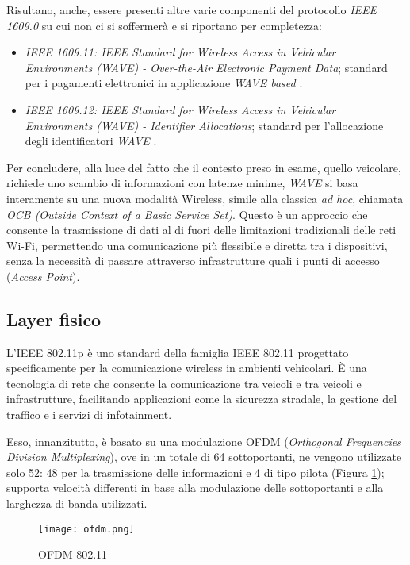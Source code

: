 Risultano, anche, essere presenti altre varie componenti del protocollo \textit{IEEE 1609.0} su cui non ci si soffermerà e si riportano per completezza:

\begin{itemize}
    \item \textit{IEEE 1609.11:  IEEE Standard for Wireless Access in Vehicular Environments (WAVE) - Over-the-Air Electronic Payment Data}; standard per i pagamenti elettronici in applicazione \textit{WAVE based} \cite{5692959}.
    \item \textit{IEEE 1609.12:  IEEE Standard for Wireless Access in Vehicular Environments (WAVE) - Identifier Allocations}; standard per l'allocazione degli identificatori \textit{WAVE} \cite{8877516}.
\end{itemize}

Per concludere, alla luce del fatto che il contesto preso in esame, quello veicolare, richiede uno scambio di informazioni con latenze minime, \textit{WAVE} si basa interamente su una nuova modalità Wireless, simile alla classica \textit{ad hoc}, chiamata \textit{OCB (Outside Context of a Basic Service Set)}. Questo è un approccio che consente la trasmissione di dati al di fuori delle limitazioni tradizionali delle reti Wi-Fi, permettendo una comunicazione più flessibile e diretta tra i dispositivi, senza la necessità di passare attraverso infrastrutture quali i punti di accesso (\textit{Access Point}).

\subsection[Layer fisico]{Layer fisico}
L'IEEE 802.11p è uno standard della famiglia IEEE 802.11 progettato specificamente per la comunicazione wireless in ambienti vehicolari. È una tecnologia di rete che consente la comunicazione tra veicoli e tra veicoli e infrastrutture, facilitando applicazioni come la sicurezza stradale, la gestione del traffico e i servizi di infotainment.

Esso, innanzitutto, è basato su una modulazione OFDM (\textit{Orthogonal Frequencies Division Multiplexing}), ove in un totale di 64 sottoportanti, ne vengono utilizzate solo 52: 48 per la trasmissione delle informazioni e 4 di tipo pilota (Figura \ref{fig:ofdm}); supporta velocità differenti in base alla modulazione delle sottoportanti e alla larghezza di banda utilizzati.

\begin{figure}[h!]
    \centering
    \texttt{[image: ofdm.png]}
    \caption{OFDM 802.11}
    \label{fig:ofdm}
\end{figure}

